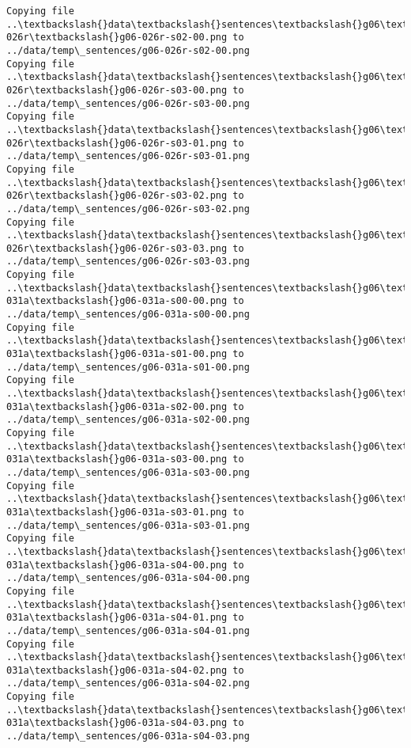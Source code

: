 \documentclass[11pt]{article}
\begin{document}
\begin{Verbatim}[commandchars=\\\{\}]
Copying file ..\textbackslash{}data\textbackslash{}sentences\textbackslash{}g06\textbackslash{}g06-026r\textbackslash{}g06-026r-s02-00.png to
../data/temp\_sentences/g06-026r-s02-00.png
Copying file ..\textbackslash{}data\textbackslash{}sentences\textbackslash{}g06\textbackslash{}g06-026r\textbackslash{}g06-026r-s03-00.png to
../data/temp\_sentences/g06-026r-s03-00.png
Copying file ..\textbackslash{}data\textbackslash{}sentences\textbackslash{}g06\textbackslash{}g06-026r\textbackslash{}g06-026r-s03-01.png to
../data/temp\_sentences/g06-026r-s03-01.png
Copying file ..\textbackslash{}data\textbackslash{}sentences\textbackslash{}g06\textbackslash{}g06-026r\textbackslash{}g06-026r-s03-02.png to
../data/temp\_sentences/g06-026r-s03-02.png
Copying file ..\textbackslash{}data\textbackslash{}sentences\textbackslash{}g06\textbackslash{}g06-026r\textbackslash{}g06-026r-s03-03.png to
../data/temp\_sentences/g06-026r-s03-03.png
Copying file ..\textbackslash{}data\textbackslash{}sentences\textbackslash{}g06\textbackslash{}g06-031a\textbackslash{}g06-031a-s00-00.png to
../data/temp\_sentences/g06-031a-s00-00.png
Copying file ..\textbackslash{}data\textbackslash{}sentences\textbackslash{}g06\textbackslash{}g06-031a\textbackslash{}g06-031a-s01-00.png to
../data/temp\_sentences/g06-031a-s01-00.png
Copying file ..\textbackslash{}data\textbackslash{}sentences\textbackslash{}g06\textbackslash{}g06-031a\textbackslash{}g06-031a-s02-00.png to
../data/temp\_sentences/g06-031a-s02-00.png
Copying file ..\textbackslash{}data\textbackslash{}sentences\textbackslash{}g06\textbackslash{}g06-031a\textbackslash{}g06-031a-s03-00.png to
../data/temp\_sentences/g06-031a-s03-00.png
Copying file ..\textbackslash{}data\textbackslash{}sentences\textbackslash{}g06\textbackslash{}g06-031a\textbackslash{}g06-031a-s03-01.png to
../data/temp\_sentences/g06-031a-s03-01.png
Copying file ..\textbackslash{}data\textbackslash{}sentences\textbackslash{}g06\textbackslash{}g06-031a\textbackslash{}g06-031a-s04-00.png to
../data/temp\_sentences/g06-031a-s04-00.png
Copying file ..\textbackslash{}data\textbackslash{}sentences\textbackslash{}g06\textbackslash{}g06-031a\textbackslash{}g06-031a-s04-01.png to
../data/temp\_sentences/g06-031a-s04-01.png
Copying file ..\textbackslash{}data\textbackslash{}sentences\textbackslash{}g06\textbackslash{}g06-031a\textbackslash{}g06-031a-s04-02.png to
../data/temp\_sentences/g06-031a-s04-02.png
Copying file ..\textbackslash{}data\textbackslash{}sentences\textbackslash{}g06\textbackslash{}g06-031a\textbackslash{}g06-031a-s04-03.png to
../data/temp\_sentences/g06-031a-s04-03.png

\end{Verbatim}
\end{document}
